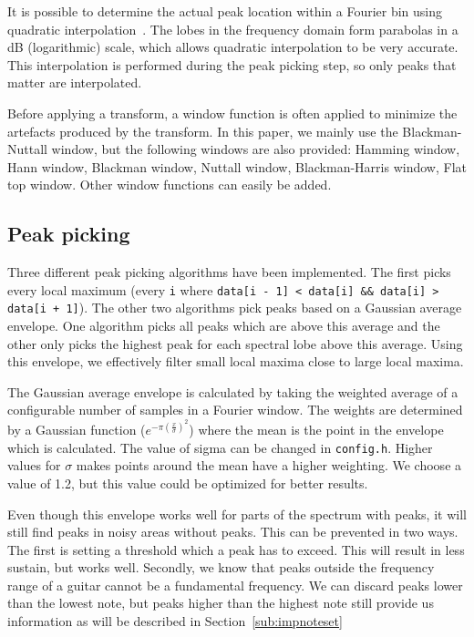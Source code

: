 \documentclass[10pt,twocolumn]{article}
\begin{document}
It is possible to determine the actual peak location within a Fourier bin using quadratic interpolation~\cite{interpol2}. The lobes in the frequency domain form parabolas in a dB (logarithmic) scale, which allows quadratic interpolation to be very accurate. This interpolation is performed during the peak picking step, so only peaks that matter are interpolated.

Before applying a transform, a window function is often applied to minimize the artefacts produced by the transform. In this paper, we mainly use the Blackman-Nuttall window, but the following windows are also provided: Hamming window, Hann window, Blackman window, Nuttall window, Blackman-Harris window, Flat top window. Other window functions can easily be added.

\subsection{Peak picking}
Three different peak picking algorithms have been implemented. The first picks every local maximum (every \texttt{i} where \texttt{data[i - 1] < data[i] \&\& data[i] > data[i + 1]}). The other two algorithms pick peaks based on a Gaussian average envelope. One algorithm picks all peaks which are above this average and the other only picks the highest peak for each spectral lobe above this average. Using this envelope, we effectively filter small local maxima close to large local maxima.

The Gaussian average envelope is calculated by taking the weighted average of a configurable number of samples in a Fourier window. The weights are determined by a Gaussian function ($e^{-\pi(\frac{x}{\sigma})^2}$) where the mean is the point in the envelope which is calculated. The value of sigma can be changed in \texttt{config.h}. Higher values for $\sigma$ makes points around the mean have a higher weighting. We choose a value of 1.2, but this value could be optimized for better results.

Even though this envelope works well for parts of the spectrum with peaks, it will still find peaks in noisy areas without peaks. This can be prevented in two ways. The first is setting a threshold which a peak has to exceed. This will result in less sustain, but works well. Secondly, we know that peaks outside the frequency range of a guitar cannot be a fundamental frequency. We can discard peaks lower than the lowest note, but peaks higher than the highest note still provide us information as will be described in Section~\ref{sub:impnoteset}
\end{document}
